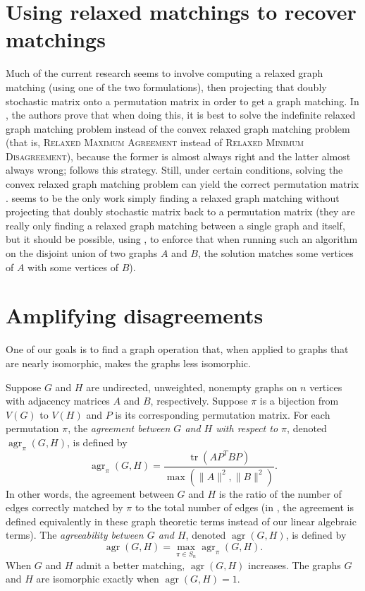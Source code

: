 \documentclass{article}
\newcommand{\1}{\mathbf{1}}
\newcommand{\RMD}{\textsc{Relaxed Minimum Disagreement}}
\newcommand{\RMA}{\textsc{Relaxed Maximum Agreement}}
\DeclareMathOperator{\tr}{tr}
\DeclareMathOperator{\agr}{agr}
\begin{document}
\section{Using relaxed matchings to recover matchings}

Much of the current research seems to involve computing a relaxed graph matching (using one of the two formulations), then projecting that doubly stochastic matrix onto a permutation matrix in order to get a graph matching.
In \autocite{relax14}, the authors prove that when doing this, it is best to solve the indefinite relaxed graph matching problem instead of the convex relaxed graph matching problem (that is, \RMA{} instead of \RMD{}), because the former is almost always right and the latter almost always wrong; \autocite{v14} follows this strategy.
Still, under certain conditions, solving the convex relaxed graph matching problem can yield the correct permutation matrix \autocite{abk14, fs14}.
\autocite{kmgg14} seems to be the only work simply finding a relaxed graph matching without projecting that doubly stochastic matrix back to a permutation matrix (they are really only finding a relaxed graph matching between a single graph and itself, but it should be possible, using \autocite{gkms14}, to enforce that when running such an algorithm on the disjoint union of two graphs $A$ and $B$, the solution matches some vertices of $A$ with some vertices of $B$).

\section{Amplifying disagreements}

One of our goals is to find a graph operation that, when applied to graphs that are nearly isomorphic, makes the graphs less isomorphic.

Suppose $G$ and $H$ are undirected, unweighted, nonempty graphs on $n$ vertices with adjacency matrices $A$ and $B$, respectively.
Suppose $\pi$ is a bijection from $V(G)$ to $V(H)$ and $P$ is its corresponding permutation matrix.
For each permutation $\pi$, the \emph{agreement between $G$ and $H$ with respect to $\pi$}, denoted $\agr_\pi(G, H)$, is defined by
\begin{equation*}
  \agr_\pi(G, H) = \frac{\tr(AP^TBP)}{\max(\|A\|^2, \|B\|^2)}.
\end{equation*}
In other words, the agreement between $G$ and $H$ is the ratio of the number of edges correctly matched by $\pi$ to the total number of edges (in \autocite{owwz14}, the agreement is defined equivalently in these graph theoretic terms instead of our linear algebraic terms).
The \emph{agreeability between $G$ and $H$}, denoted $\agr(G, H)$, is defined by
\begin{equation*}
  \agr(G, H) = \max_{\pi \in S_n} \agr_\pi(G, H).
\end{equation*}
When $G$ and $H$ admit a better matching, $\agr(G, H)$ increases.
The graphs $G$ and $H$ are isomorphic exactly when $\agr(G, H) = 1$.
\end{document}
